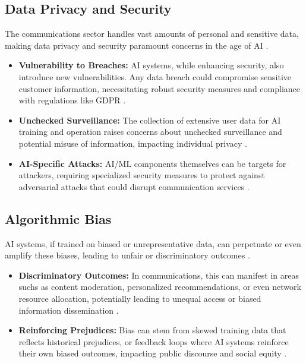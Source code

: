 \subsection{Data Privacy and Security}
The communications sector handles vast amounts of personal and sensitive data, making data privacy and security paramount concerns in the age of AI \cite{Ocasta_DataPrivacy}.
\begin{itemize}
    \item \textbf{Vulnerability to Breaches:} AI systems, while enhancing security, also introduce new vulnerabilities. Any data breach could compromise sensitive customer information, necessitating robust security measures and compliance with regulations like GDPR \cite{ITBrief_DataPrivacy, IBM_DataPrivacy}.
    \item \textbf{Unchecked Surveillance:} The collection of extensive user data for AI training and operation raises concerns about unchecked surveillance and potential misuse of information, impacting individual privacy \cite{TelecomParis_DataPrivacy}.
\item \textbf{AI-Specific Attacks:} AI/ML components themselves can be targets for attackers, requiring specialized security measures to protect against adversarial attacks that could disrupt communication services \cite{Fortinet_NetworkSecurity}.
\end{itemize}

\subsection{Algorithmic Bias}
AI systems, if trained on biased or unrepresentative data, can perpetuate or even amplify these biases, leading to unfair or discriminatory outcomes \cite{DigitalWell_AlgorithmicBias}.
\begin{itemize}
    \item \textbf{Discriminatory Outcomes:} In communications, this can manifest in areas suchs as content moderation, personalized recommendations, or even network resource allocation, potentially leading to unequal access or biased information dissemination \cite{USC_AlgorithmicBias}.
    \item \textbf{Reinforcing Prejudices:} Bias can stem from skewed training data that reflects historical prejudices, or feedback loops where AI systems reinforce their own biased outcomes, impacting public discourse and social equity \cite{Medium_AlgorithmicBias}.
\end{itemize}

